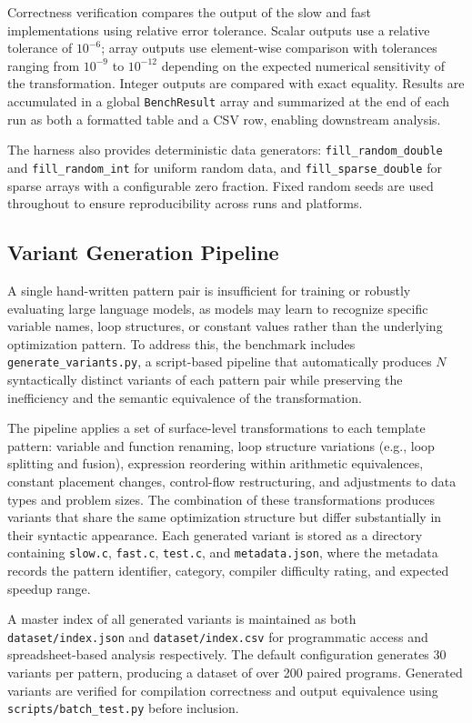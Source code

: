 Correctness verification compares the output of the slow and fast implementations using relative error tolerance. Scalar outputs use a relative tolerance of $10^{-6}$; array outputs use element-wise comparison with tolerances ranging from $10^{-9}$ to $10^{-12}$ depending on the expected numerical sensitivity of the transformation. Integer outputs are compared with exact equality. Results are accumulated in a global \texttt{BenchResult} array and summarized at the end of each run as both a formatted table and a CSV row, enabling downstream analysis.

The harness also provides deterministic data generators: \texttt{fill\_random\_double} and \texttt{fill\_random\_int} for uniform random data, and \texttt{fill\_sparse\_double} for sparse arrays with a configurable zero fraction. Fixed random seeds are used throughout to ensure reproducibility across runs and platforms.

\subsection{Variant Generation Pipeline}

A single hand-written pattern pair is insufficient for training or robustly evaluating large language models, as models may learn to recognize specific variable names, loop structures, or constant values rather than the underlying optimization pattern. To address this, the benchmark includes \texttt{generate\_variants.py}, a script-based pipeline that automatically produces $N$ syntactically distinct variants of each pattern pair while preserving the inefficiency and the semantic equivalence of the transformation.

The pipeline applies a set of surface-level transformations to each template pattern: variable and function renaming, loop structure variations (e.g., loop splitting and fusion), expression reordering within arithmetic equivalences, constant placement changes, control-flow restructuring, and adjustments to data types and problem sizes. The combination of these transformations produces variants that share the same optimization structure but differ substantially in their syntactic appearance. Each generated variant is stored as a directory containing \texttt{slow.c}, \texttt{fast.c}, \texttt{test.c}, and \texttt{metadata.json}, where the metadata records the pattern identifier, category, compiler difficulty rating, and expected speedup range.

A master index of all generated variants is maintained as both \texttt{dataset/index.json} and \texttt{dataset/index.csv} for programmatic access and spreadsheet-based analysis respectively. The default configuration generates 30 variants per pattern, producing a dataset of over 200 paired programs. Generated variants are verified for compilation correctness and output equivalence using \texttt{scripts/batch\_test.py} before inclusion.

